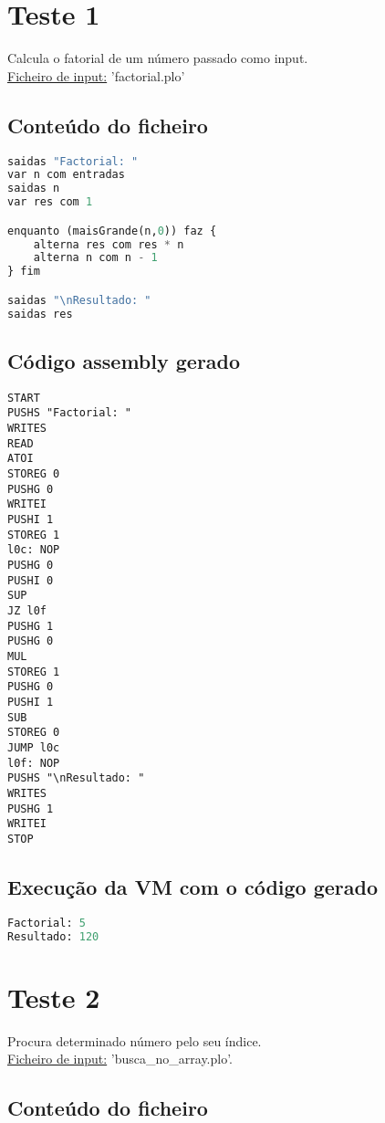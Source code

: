 \documentclass[11pt,a4paper]{report}%
\begin{document}
\section{Teste 1}
Calcula o fatorial de um número passado como input. \\
\underline{Ficheiro de input:} 'factorial.plo'
\subsection{Conteúdo do ficheiro}

\begin{lstlisting}[language=python]
saidas "Factorial: "
var n com entradas
saidas n
var res com 1

enquanto (maisGrande(n,0)) faz {
    alterna res com res * n
    alterna n com n - 1
} fim

saidas "\nResultado: "
saidas res
\end{lstlisting}

\subsection{Código assembly gerado}
\begin{lstlisting}[languague=Assembler]
START
PUSHS "Factorial: "
WRITES
READ
ATOI
STOREG 0
PUSHG 0
WRITEI
PUSHI 1
STOREG 1
l0c: NOP
PUSHG 0
PUSHI 0
SUP
JZ l0f
PUSHG 1
PUSHG 0
MUL
STOREG 1
PUSHG 0
PUSHI 1
SUB
STOREG 0
JUMP l0c
l0f: NOP
PUSHS "\nResultado: "
WRITES
PUSHG 1
WRITEI
STOP
\end{lstlisting}


\subsection{Execução da VM com o código gerado}
\begin{lstlisting}[language=python]
Factorial: 5
Resultado: 120
\end{lstlisting}


\section{Teste 2}
Procura determinado número pelo seu índice. \\
\underline{Ficheiro de input:} 'busca\_no\_array.plo'.

\subsection{Conteúdo do ficheiro}
\end{document}
